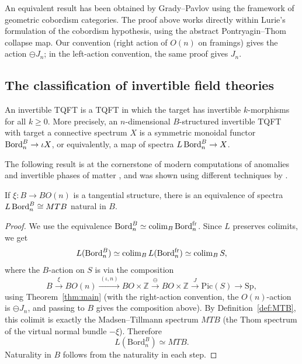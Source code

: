 \documentclass{amsart}
\begin{document}
\begin{remark}
\label{rmk:GP-comparison}
An equivalent result has been obtained by Grady--Pavlov \cite[Theorem 5.0.6]{grady2021geometric} using the framework of geometric cobordism categories. The proof above works directly within Lurie's formulation of the cobordism hypothesis, using the abstract Pontryagin--Thom collapse map. Our convention (right action of $O(n)$ on framings) gives the action $\ominus J_n$; in the left-action convention, the same proof gives $J_n$.
\end{remark}
\subsection{The classification of invertible field theories}

An invertible TQFT is a TQFT in which the target has invertible $k$-morphisms for all $k \geq 0$. More precisely, an $n$-dimensional $B$-structured invertible TQFT with target a connective spectrum $X$ is a symmetric monoidal functor $\operatorname{Bord}^B_n \to \iota X$, or equivalently, a map of spectra $L\operatorname{Bord}^B_n \to X$.

The following result is at the cornerstone of modern computations of anomalies and invertible phases of matter \cite{freed2021reflection}, and was shown using different techniques by \cite{MR4821355}.

\begin{proposition}
\label{prop:MTB}
If $\xi\colon B \to BO(n)$ is a tangential structure, there is an equivalence of spectra $L\operatorname{Bord}^B_n \cong MTB$ natural in $B$.
\end{proposition}
\begin{proof}
We use the equivalence $\mathrm{Bord}_n^B \simeq \operatorname{colim}_B \mathrm{Bord}_n^{\mathrm{fr}}$. Since $L$ preserves colimits, we get
\[
L(\mathrm{Bord}_n^B) \simeq \operatorname{colim}_B L(\mathrm{Bord}_n^{\mathrm{fr}}) \simeq \operatorname{colim}_B S,
\]
where the $B$-action on $S$ is via the composition
\[
B \xrightarrow{\ \xi\ } BO(n) \xrightarrow{\ (\iota, n)\ } BO \times \mathbb{Z} \xrightarrow{\ \ominus\ } BO \times \mathbb{Z} \xrightarrow{\ J\ } \mathrm{Pic}(S) \longrightarrow \mathrm{Sp},
\]
using Theorem~\ref{thm:main} (with the right-action convention, the $O(n)$-action is $\ominus J_n$, and passing to $B$ gives the composition above). By Definition~\ref{def:MTB}, this colimit is exactly the Madsen--Tillmann spectrum $MTB$ (the Thom spectrum of the virtual normal bundle $-\xi$). Therefore
\[
L(\mathrm{Bord}_n^B) \simeq MTB.
\]
Naturality in $B$ follows from the naturality in each step.
\end{proof}
\end{document}
